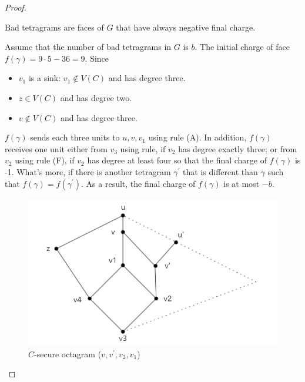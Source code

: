 \begin{proof}
\begin{itemize}
\begin{itemize}
        \begin{observation}
        Bad tetragrams are faces of $G$ that have always negative final charge. 
        \end{observation}
        Assume that the number of bad tetragrams in $G$ is $b$. The initial charge of face $f(\gamma) = 9 \cdot 5 - 36 = 9$. Since 
        \begin{itemize}
            \item $v_1$ is a sink: $v_1 \notin V(C)$ and has degree three.
            \item $z \in V(C)$ and has degree two.
            \item $v \notin V(C)$ and has degree three. 
        \end{itemize}
        $f(\gamma)$ sends each three units to $u, v, v_1$ using rule (A). In addition, $f(\gamma)$ receives one unit either from $v_3$ using rule, if $v_2$ has degree exactly three; or from $v_2$ using rule (F), if $v_2$ has degree at least four so that the final charge of $f(\gamma)$ is -1. What's more, if there is another tetragram $\gamma^{'}$ that is different than $\gamma$ such that $f(\gamma) = f(\gamma^{'})$. As a result, the final charge of $f(\gamma)$ is at most $-b$.
        
        \begin{figure}[H] %
            \centering %
            \includegraphics[width=0.7 \textwidth]{figure/last5thsection.png} 
            \caption{$C$-secure octagram ($v, v^{'}, v_2, v_1$)} %
            \label{figure} %
        \end{figure}
    \end{itemize}
\end{itemize}
\end{proof}

